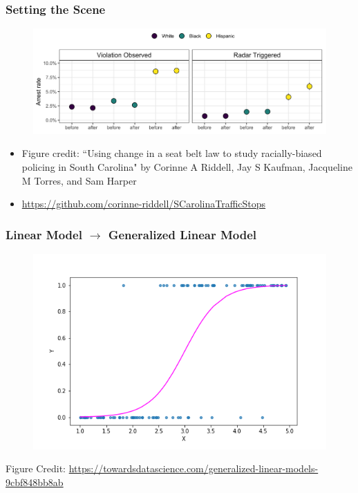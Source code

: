 \documentclass{beamer}
\begin{document}
\begin{frame}
\frametitle{Setting the Scene}


\begin{figure}
\includegraphics[scale=.5]{figures/arrestRates}
\end{figure}


\begin{itemize}

\item Figure credit: ``Using change in a seat belt law to study racially-biased policing in South Carolina" by Corinne A Riddell, Jay S Kaufman, Jacqueline M Torres, and Sam Harper

\item \url{https://github.com/corinne-riddell/SCarolinaTrafficStops}

\end{itemize}

\end{frame}

\begin{frame}
\frametitle{Linear Model $\rightarrow$ Generalized Linear Model}

\begin{figure}
\includegraphics[scale=.4]{figures/logReg}

\end{figure}


Figure Credit: \url{https://towardsdatascience.com/generalized-linear-models-9cbf848bb8ab}


\end{frame}
\end{document}
